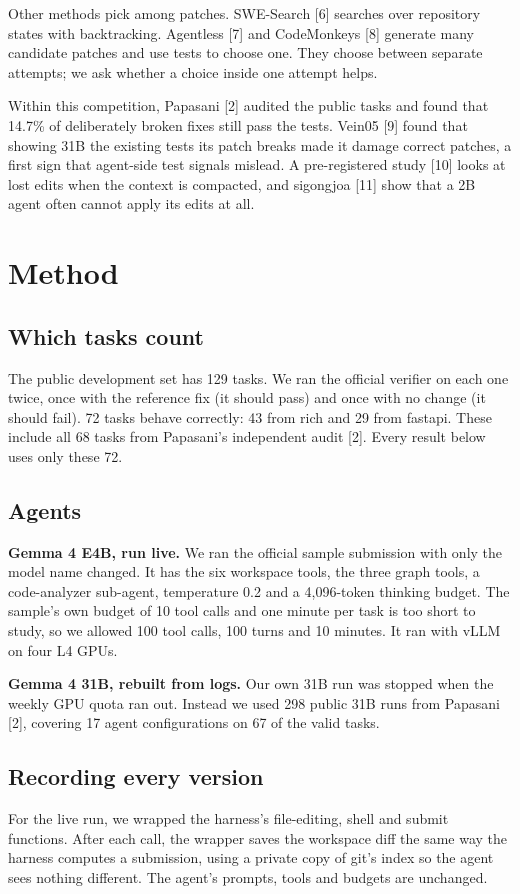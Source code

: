 \documentclass[10pt]{article}
\begin{document}
Other methods pick among patches. SWE-Search [6] searches over repository states with backtracking. Agentless [7] and CodeMonkeys [8] generate many candidate patches and use tests to choose one. They choose between separate attempts; we ask whether a choice inside one attempt helps.

Within this competition, Papasani [2] audited the public tasks and found that 14.7\% of deliberately broken fixes still pass the tests. Vein05 [9] found that showing 31B the existing tests its patch breaks made it damage correct patches, a first sign that agent-side test signals mislead. A pre-registered study [10] looks at lost edits when the context is compacted, and sigongjoa [11] show that a 2B agent often cannot apply its edits at all.

\section*{Method}
\subsection*{Which tasks count}
The public development set has 129 tasks. We ran the official verifier on each one twice, once with the reference fix (it should pass) and once with no change (it should fail). 72 tasks behave correctly: 43 from rich and 29 from fastapi. These include all 68 tasks from Papasani's independent audit [2]. Every result below uses only these 72.

\subsection*{Agents}
\textbf{Gemma 4 E4B, run live.} We ran the official sample submission with only the model name changed. It has the six workspace tools, the three graph tools, a code-analyzer sub-agent, temperature 0.2 and a 4,096-token thinking budget. The sample's own budget of 10 tool calls and one minute per task is too short to study, so we allowed 100 tool calls, 100 turns and 10 minutes. It ran with vLLM on four L4 GPUs.

\textbf{Gemma 4 31B, rebuilt from logs.} Our own 31B run was stopped when the weekly GPU quota ran out. Instead we used 298 public 31B runs from Papasani [2], covering 17 agent configurations on 67 of the valid tasks.

\subsection*{Recording every version}
For the live run, we wrapped the harness's file-editing, shell and submit functions. After each call, the wrapper saves the workspace diff the same way the harness computes a submission, using a private copy of git's index so the agent sees nothing different. The agent's prompts, tools and budgets are unchanged.
\end{document}
